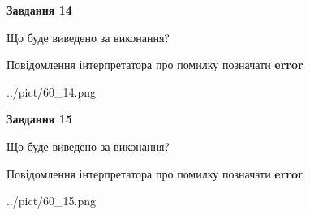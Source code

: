 \documentclass[11pt, ukrainian]{article}
\begin{document}
{\begin {large}
{\begin {center}\textbf{Завдання 14}\end {center}}\par
Що буде виведено за виконання? \par
Повідомлення інтерпретатора про помилку позначати \textbf{error}

\begin{center}
	{../pict/60_14.png}
\end{center}
\newpage

{\begin {center}\textbf{Завдання 15}\end {center}}\par
Що буде виведено за виконання? \par
Повідомлення інтерпретатора про помилку позначати \textbf{error}

\begin{center}
	{../pict/60_15.png}
\end{center}
\newpage

\end {large}}
\end{document}
